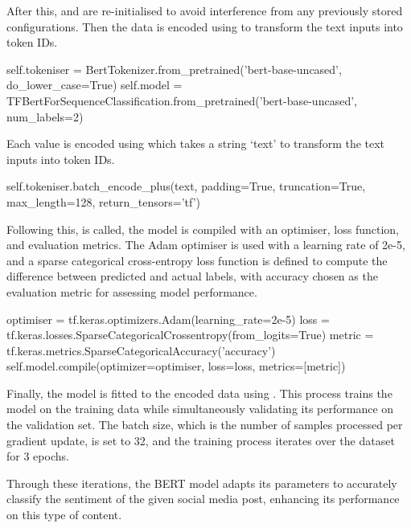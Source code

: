         After this,  and  are re-initialised to avoid interference from any previously stored configurations. Then the data is encoded using  to transform the text inputs into token IDs.

        \begin{python}
self.tokeniser = BertTokenizer.from_pretrained('bert-base-uncased', do_lower_case=True)
self.model = TFBertForSequenceClassification.from_pretrained('bert-base-uncased', num_labels=2)
        \end{python}

        Each value is encoded using  which takes a string `text' to transform the text inputs into token IDs.

        \begin{python}
self.tokeniser.batch_encode_plus(text, padding=True, truncation=True, max_length=128, return_tensors='tf') 
        \end{python}

        Following this,  is called, the model is compiled with an optimiser, loss function, and evaluation metrics. The Adam optimiser is used with a learning rate of 2e-5, and a sparse categorical cross-entropy loss function is defined to compute the difference between predicted and actual labels, with accuracy chosen as the evaluation metric for assessing model performance.

        \begin{python}
optimiser = tf.keras.optimizers.Adam(learning_rate=2e-5)
loss = tf.keras.losses.SparseCategoricalCrossentropy(from_logits=True)
metric = tf.keras.metrics.SparseCategoricalAccuracy('accuracy')
self.model.compile(optimizer=optimiser, loss=loss, metrics=[metric])
        \end{python}

        Finally, the model is fitted to the encoded data using . This process trains the model on the training data while simultaneously validating its performance on the validation set. The batch size, which is the number of samples processed per gradient update, is set to 32, and the training process iterates over the dataset for 3 epochs.

        Through these iterations, the BERT model adapts its parameters to accurately classify the sentiment of the given social media post, enhancing its performance on this type of content.

